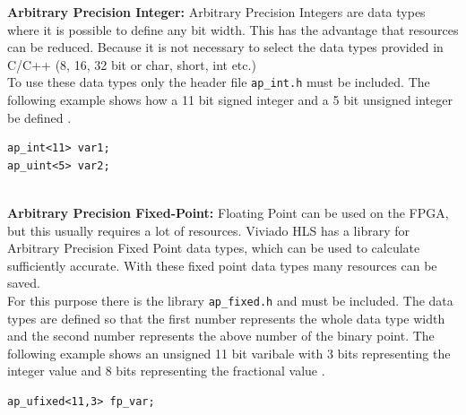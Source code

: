 \textbf{Arbitrary Precision Integer:}
Arbitrary Precision Integers are data types where it is possible to define any bit width. This has the advantage that resources can be reduced. Because it is not necessary to select the data types provided in C/C++ (8, 16, 32 bit or char, short, int etc.) \\
To use these data types only the header file \texttt{ap\_int.h} must be included. The following example shows how a 11 bit signed integer and a 5 bit unsigned integer be defined \cite{ug902}.

\begin{minipage}{\textwidth}
\begin{lstlisting}[style=CStyle]
ap_int<11> var1;
ap_uint<5> var2;
\end{lstlisting}
\end{minipage} \\

\textbf{Arbitrary Precision Fixed-Point:}
Floating Point can be used on the FPGA, but this usually requires a lot of resources. Viviado HLS has a library for Arbitrary Precision Fixed Point data types, which can be used to calculate sufficiently accurate. With these fixed point data types many resources can be saved. \\
For this purpose there is the library \texttt{ap\_fixed.h} and must be included. The data types are defined so that the first number represents the whole data type width and the second number represents the above number of the binary point. The following example shows an unsigned 11 bit varibale with 3 bits representing the integer value and 8 bits representing the fractional value \cite{ug902}. 

\begin{minipage}{\textwidth}
\begin{lstlisting}[style=CStyle]
ap_ufixed<11,3> fp_var;
\end{lstlisting}
\end{minipage}
